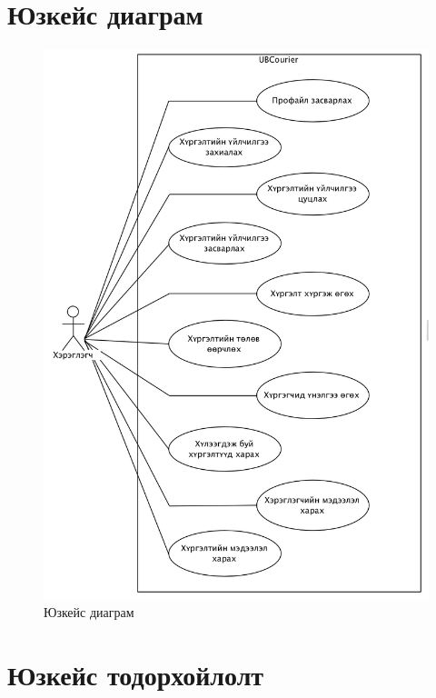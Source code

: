 \section{Юзкейс диаграм}
\begin{figure}[H]
	\centering
	\includegraphics[width=\textwidth]{Figures/shinjilgee/usecase.png}
	\caption{Юзкейс диаграм}
\end{figure}


\section{Юзкейс тодорхойлолт}

